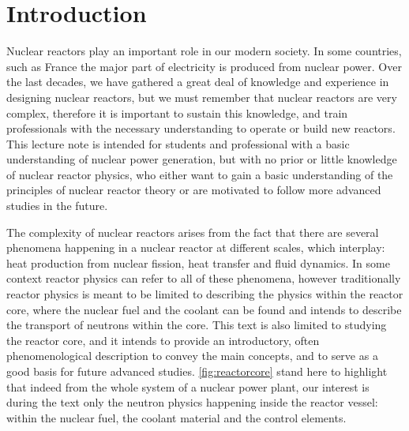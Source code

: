 %
% 
%
%
%
%
%

\section{Introduction}

Nuclear reactors play an important role in our modern society. In some countries, such as France  the major part of electricity is produced from nuclear power. Over the last decades, we have gathered a great deal of knowledge and experience in designing nuclear reactors, but we must remember that nuclear reactors are very complex, therefore it is important to sustain this knowledge, and train professionals with the necessary understanding to operate or build new reactors. This lecture note is intended for students and professional with a basic understanding of nuclear power generation, but with no prior or little knowledge of nuclear reactor physics, who either want to gain a basic understanding of the principles of nuclear reactor theory or are motivated to follow more advanced studies in the future.

The complexity of nuclear reactors arises from the fact that there are several phenomena happening in a nuclear reactor at different scales, which interplay: heat production from nuclear fission, heat transfer and fluid dynamics. In some context reactor physics can refer to all of these phenomena, however traditionally reactor physics is meant to be limited to describing the physics within the reactor core, where the nuclear fuel and the coolant can be found and intends to describe the transport of neutrons within the core. This text is also limited to studying the reactor core, and it intends to provide an introductory, often phenomenological description to convey the main concepts, and to serve as a good basis for future advanced studies. \autoref{fig:reactorcore} stand here to highlight that indeed from the whole system of a nuclear power plant, our interest is during the text only the neutron physics happening inside the reactor vessel: within the nuclear fuel, the coolant material and the control elements. 


